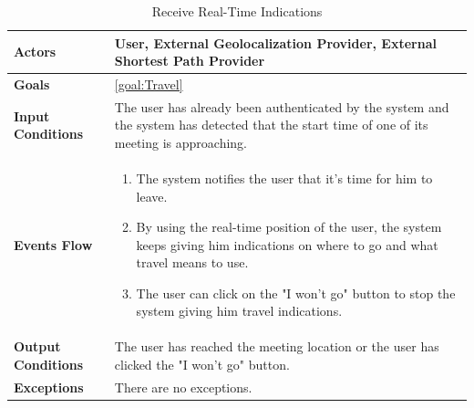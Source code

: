 \begin{table}[H]
	\centering
	\def\arraystretch{1.5}
	\begin{tabular}{|p{7cm}|p{7cm}|}
		\hline
		\textbf{Actors}            & User, External Geolocalization Provider, External Shortest Path Provider		    \\ \hline
		\textbf{Goals}             & \ref{goal:Travel}         \\ \hline
		\textbf{Input Conditions}  & The user has already been authenticated by the system and the system has detected that the start time of one of its meeting is approaching.           \\ \hline
		\textbf{Events Flow}       & 
			\begin{enumerate}[topsep=0pt, leftmargin=*]
				\item The system notifies the user that it's time for him to leave.
				\item By using the real-time position of the user, the system keeps giving him indications on where to go and what travel means to use.
				\item The user can click on the "I won't go" button to stop the system giving him travel indications.
			\end{enumerate}	        \\ \hline
		\textbf{Output Conditions} & The user has reached the meeting location or the user has clicked the "I won't go" button.           \\ \hline
		\textbf{Exceptions}        & There are no exceptions.           \\ \hline
	\end{tabular}
	\caption{Receive Real-Time Indications}
\end{table}

